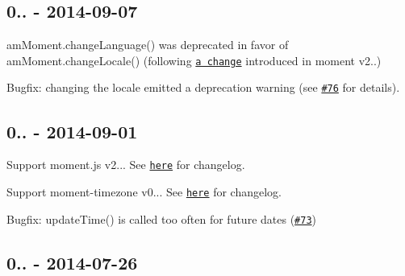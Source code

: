 \subsection*{0.. -\/ 2014-\/09-\/07}


\begin{DoxyItemize}
\item {\ttfamily am\+Moment.\+change\+Language()} was deprecated in favor of {\ttfamily am\+Moment.\+change\+Locale()} (following \href{http://momentjs.com/docs/#/i18n/changing-locale/}{\tt a change} introduced in moment v2..)
\item Bugfix\+: changing the locale emitted a deprecation warning (see \href{https://github.com/urish/angular-moment/issues/76}{\tt \#76} for details).
\end{DoxyItemize}

\subsection*{0.. -\/ 2014-\/09-\/01}


\begin{DoxyItemize}
\item Support moment.\+js v2... See \href{https://gist.github.com/ichernev/ac3899324a5fa6c8c9b4}{\tt here} for changelog.
\item Support moment-\/timezone v0... See \href{https://github.com/moment/moment-timezone/blob/develop/changelog.md#021-2014-08-02}{\tt here} for changelog.
\item Bugfix\+: {\ttfamily update\+Time()} is called too often for future dates (\href{https://github.com/urish/angular-moment/issues/73}{\tt \#73})
\end{DoxyItemize}

\subsection*{0.. -\/ 2014-\/07-\/26}


